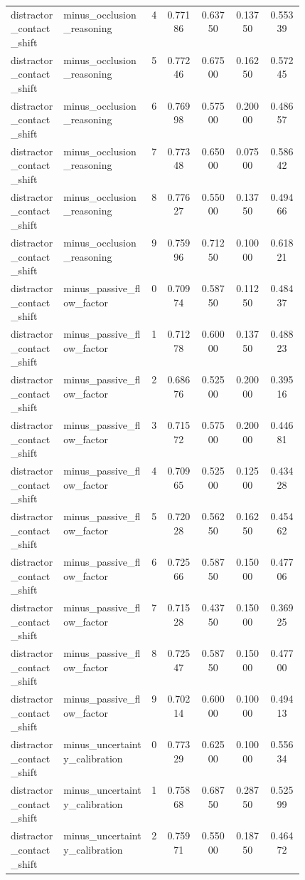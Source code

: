 \documentclass{article}
\begin{document}
\begin{center}
\begin{longtable}{p{0.18\linewidth}p{0.30\linewidth}ccccc}
distractor\_contact\_shift & minus\_occlusion\_reasoning & 4 & 0.77186 & 0.63750 & 0.13750 & 0.55339\\
distractor\_contact\_shift & minus\_occlusion\_reasoning & 5 & 0.77246 & 0.67500 & 0.16250 & 0.57245\\
distractor\_contact\_shift & minus\_occlusion\_reasoning & 6 & 0.76998 & 0.57500 & 0.20000 & 0.48657\\
distractor\_contact\_shift & minus\_occlusion\_reasoning & 7 & 0.77348 & 0.65000 & 0.07500 & 0.58642\\
distractor\_contact\_shift & minus\_occlusion\_reasoning & 8 & 0.77627 & 0.55000 & 0.13750 & 0.49466\\
distractor\_contact\_shift & minus\_occlusion\_reasoning & 9 & 0.75996 & 0.71250 & 0.10000 & 0.61821\\
distractor\_contact\_shift & minus\_passive\_flow\_factor & 0 & 0.70974 & 0.58750 & 0.11250 & 0.48437\\
distractor\_contact\_shift & minus\_passive\_flow\_factor & 1 & 0.71278 & 0.60000 & 0.13750 & 0.48823\\
distractor\_contact\_shift & minus\_passive\_flow\_factor & 2 & 0.68676 & 0.52500 & 0.20000 & 0.39516\\
distractor\_contact\_shift & minus\_passive\_flow\_factor & 3 & 0.71572 & 0.57500 & 0.20000 & 0.44681\\
distractor\_contact\_shift & minus\_passive\_flow\_factor & 4 & 0.70965 & 0.52500 & 0.12500 & 0.43428\\
distractor\_contact\_shift & minus\_passive\_flow\_factor & 5 & 0.72028 & 0.56250 & 0.16250 & 0.45462\\
distractor\_contact\_shift & minus\_passive\_flow\_factor & 6 & 0.72566 & 0.58750 & 0.15000 & 0.47706\\
distractor\_contact\_shift & minus\_passive\_flow\_factor & 7 & 0.71528 & 0.43750 & 0.15000 & 0.36925\\
distractor\_contact\_shift & minus\_passive\_flow\_factor & 8 & 0.72547 & 0.58750 & 0.15000 & 0.47700\\
distractor\_contact\_shift & minus\_passive\_flow\_factor & 9 & 0.70214 & 0.60000 & 0.10000 & 0.49413\\
distractor\_contact\_shift & minus\_uncertainty\_calibration & 0 & 0.77329 & 0.62500 & 0.10000 & 0.55634\\
distractor\_contact\_shift & minus\_uncertainty\_calibration & 1 & 0.75868 & 0.68750 & 0.28750 & 0.52599\\
distractor\_contact\_shift & minus\_uncertainty\_calibration & 2 & 0.75971 & 0.55000 & 0.18750 & 0.46472\\

\end{longtable}
\end{center}
\end{document}
